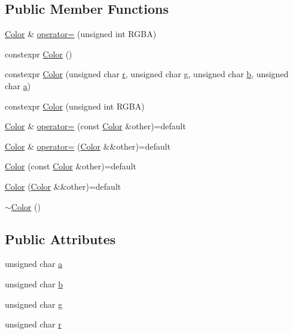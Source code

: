 \subsection*{Public Member Functions}
\begin{DoxyCompactItemize}
\item 
\hyperlink{classZeta_1_1Color}{Color} \& \hyperlink{classZeta_1_1Color_aff976900fa0c51c742e3345d0bc27f10}{operator=} (unsigned int R\+G\+B\+A)
\item 
constexpr \hyperlink{classZeta_1_1Color_a1c0837513aef1fa9ded2aa4c6feda6b6}{Color} ()
\item 
constexpr \hyperlink{classZeta_1_1Color_a3c8c6c9c4d6e3bc834d7ecd70c0a1860}{Color} (unsigned char \hyperlink{classZeta_1_1Color_ab68e8e6fef0897fa6aaf8f146f84e3f3}{r}, unsigned char \hyperlink{classZeta_1_1Color_ace64cee4008c1510194a6ecac6cfe054}{g}, unsigned char \hyperlink{classZeta_1_1Color_aadf5ef88938d4df94d82e00052592338}{b}, unsigned char \hyperlink{classZeta_1_1Color_ad77a91a8d6ba6cab44c9e9bfae669ec0}{a})
\item 
constexpr \hyperlink{classZeta_1_1Color_ad4bda4cc7675712b8846821ff8bc7ba5}{Color} (unsigned int R\+G\+B\+A)
\item 
\hyperlink{classZeta_1_1Color}{Color} \& \hyperlink{classZeta_1_1Color_a07d268f5be983e561df11491d3f842ff}{operator=} (const \hyperlink{classZeta_1_1Color}{Color} \&other)=default
\item 
\hyperlink{classZeta_1_1Color}{Color} \& \hyperlink{classZeta_1_1Color_a5379d58470b953b6270b14700bafde92}{operator=} (\hyperlink{classZeta_1_1Color}{Color} \&\&other)=default
\item 
\hyperlink{classZeta_1_1Color_a84e49d019822b365daeefdabe0929a2f}{Color} (const \hyperlink{classZeta_1_1Color}{Color} \&other)=default
\item 
\hyperlink{classZeta_1_1Color_ac56538bb8ccdf0f976b88513fe4c79e2}{Color} (\hyperlink{classZeta_1_1Color}{Color} \&\&other)=default
\item 
\hyperlink{classZeta_1_1Color_aa8b7b90a765114693318cb9d6f435a59}{$\sim$\+Color} ()
\end{DoxyCompactItemize}
\subsection*{Public Attributes}
\begin{DoxyCompactItemize}
\item 
unsigned char \hyperlink{classZeta_1_1Color_ad77a91a8d6ba6cab44c9e9bfae669ec0}{a}
\item 
unsigned char \hyperlink{classZeta_1_1Color_aadf5ef88938d4df94d82e00052592338}{b}
\item 
unsigned char \hyperlink{classZeta_1_1Color_ace64cee4008c1510194a6ecac6cfe054}{g}
\item 
unsigned char \hyperlink{classZeta_1_1Color_ab68e8e6fef0897fa6aaf8f146f84e3f3}{r}
\end{DoxyCompactItemize}
